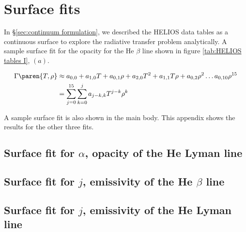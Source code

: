 \chapter{Surface fits}

In \S \eqref{sec:continuum formulation}, we described the HELIOS data tables as a continuous surface to explore the radiative transfer problem analytically. A sample surface fit for the opacity for the He $\beta$ line shown in figure \eqref{tab:HELIOS tables I}, $(a)$. 

\begin{equation}
  \begin{split}
    \Gamma \paren{ T, \rho } 
      & \approx a_{0,0} + a_{1,0} T + a_{0,1} \rho + a_{2,0} T^{2} + a_{1,1} T \rho + a_{0,2} \rho^{2} \dots a_{0,10} \rho^{15}  \\
      & = \sum_{j=0}^{15}{ \sum_{k=0}^{j}{ a_{j-k,k}T^{j-k}\rho^{k} } }
  \end{split}
\end{equation}

A sample surface fit is also shown in the main body. This appendix shows the results for the other three fits.

\section{Surface fit for $\alpha$, opacity of the He Lyman line}

\clearpage
\section{Surface fit for $j$, emissivity of the He $\beta$ line}

\clearpage
\section{Surface fit for $j$, emissivity of the He Lyman line}

\endinput %